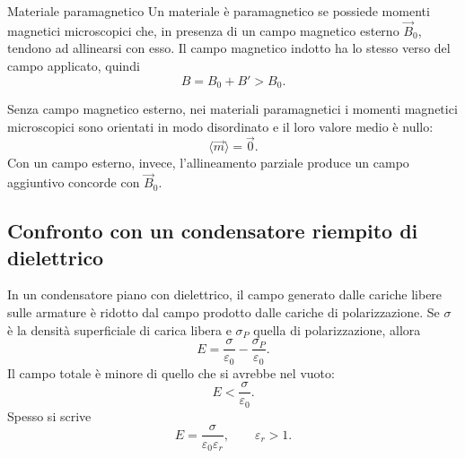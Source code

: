 \documentclass[a4paper]{article}
\begin{document}
\begin{snippetdefinition}{Materiale paramagnetico}
Un materiale è paramagnetico se possiede momenti magnetici microscopici che, in presenza di un campo magnetico esterno \(\vec{B}_0\), tendono ad allinearsi con esso. Il campo magnetico indotto ha lo stesso verso del campo applicato, quindi
\[
    B=B_0+B'>B_0.
\]
\end{snippetdefinition}

\begin{center}
\end{center}

Senza campo magnetico esterno, nei materiali paramagnetici i momenti magnetici microscopici sono orientati in modo disordinato e il loro valore medio è nullo:
\[
\langle\vec{m}\rangle=\vec{0}.
\]
Con un campo esterno, invece, l'allineamento parziale produce un campo aggiuntivo concorde con \(\vec{B}_0\).

\subsection{Confronto con un condensatore riempito di dielettrico}

In un condensatore piano con dielettrico, il campo generato dalle cariche libere sulle armature è ridotto dal campo prodotto dalle cariche di polarizzazione. Se \(\sigma\) è la densità superficiale di carica libera e \(\sigma_P\) quella di polarizzazione, allora
\[
E=\frac{\sigma}{\varepsilon_0}-\frac{\sigma_P}{\varepsilon_0}.
\]
Il campo totale è minore di quello che si avrebbe nel vuoto:
\[
E<\frac{\sigma}{\varepsilon_0}.
\]
Spesso si scrive
\[
E=\frac{\sigma}{\varepsilon_0\varepsilon_r},
\qquad
\varepsilon_r>1.
\]

\begin{center}
\end{center}
\end{document}
